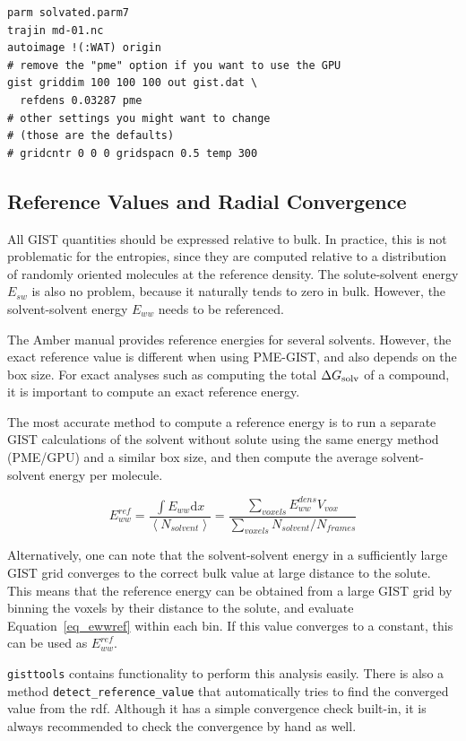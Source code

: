 \documentclass[9pt,tutorial]{livecoms}
\newcommand{\dgsolv}{\Delta G_\textup{solv}}
\newcommand{\software}{\texttt}
\newcommand\inlinecode{\texttt}
\begin{document}
\begin{lstlisting}[style=cpptraj]
parm solvated.parm7
trajin md-01.nc
autoimage !(:WAT) origin
# remove the "pme" option if you want to use the GPU
gist griddim 100 100 100 out gist.dat \
  refdens 0.03287 pme
# other settings you might want to change
# (those are the defaults)
# gridcntr 0 0 0 gridspacn 0.5 temp 300
\end{lstlisting}
\subsection{Reference Values and Radial Convergence}
All GIST quantities should be expressed relative to bulk. In practice, this is not problematic for the entropies, since they are computed relative to a distribution of randomly oriented molecules at the reference density.
The solute-solvent energy $E_{sw}$ is also no problem, because it naturally tends to zero in bulk. 
However, the solvent-solvent energy $E_{ww}$ needs to be referenced.

The Amber manual provides reference energies for several solvents.
However, the exact reference value is different when using PME-GIST, and also depends on the box size.
For exact analyses such as computing the total $\dgsolv$ of a compound, it is important to compute an exact reference energy.

The most accurate method to compute a reference energy is to run a separate GIST calculations of the solvent without solute using the same energy method (PME/GPU) and a similar box size, and then compute the average solvent-solvent energy per molecule.

\begin{equation}
\label{eq_ewwref}
E_{ww}^\textit{ref} = \frac{\int{E_{ww}} \mathrm{d}x}{\left<N_\textit{solvent}\right>}
  = \frac{\sum_\textit{voxels}E_{ww}^\textit{dens} V_\textit{vox}}{\sum_\textit{voxels}{N_\textit{solvent}} / N_\textit{frames}}
\end{equation}

Alternatively, one can note that the solvent-solvent energy in a sufficiently large GIST grid converges to the correct bulk value at large distance to the solute.
This means that the reference energy can be obtained from a large GIST grid by binning the voxels by their distance to the solute, and evaluate Equation~\ref{eq_ewwref} within each bin.
If this value converges to a constant, this can be used as $E_{ww}^\textit{ref}$.

\software{gisttools} contains functionality to perform this analysis easily.
There is also a method \inlinecode{detect\_reference\_value} that automatically tries to find the converged value from the rdf.
Although it has a simple convergence check built-in, it is always recommended to check the convergence by hand as well.
\end{document}

